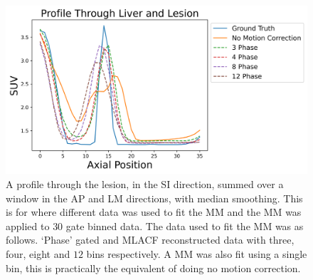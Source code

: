             \begin{figure}
                \centering
                
                \includegraphics[width=1.0\linewidth]{figures/motion_correction_2_results_2_phase_profile.png}
                
                \captionsetup{singlelinecheck=false}
                \caption{
                    A profile through the lesion, in the \gls{SI} direction, summed over a window in the \gls{AP} and \gls{LM} directions, with median smoothing. This is for where different data was used to fit the \gls{MM} and the \gls{MM} was applied to $30$ gate binned data. The data used to fit the \gls{MM} was as follows. `Phase' gated and \gls{MLACF} reconstructed data with three, four, eight and $12$ bins respectively. A \gls{MM} was also fit using a single bin, this is practically the equivalent of doing no motion correction.
                }
                
                \label{fig:evaluation_of_pet_ct_motion_correction_incorporating_motion_models_using_mlacf_and_complex_gating_schemes_results_phase_profile}
            \end{figure}

